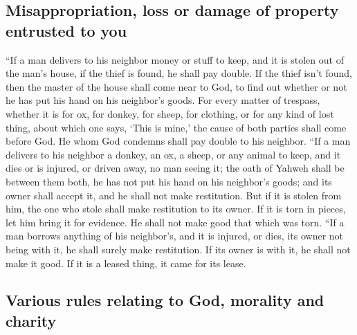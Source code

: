 \hypertarget{misappropriation-loss-or-damage-of-property-entrusted-to-you}{%
\subsection{Misappropriation, loss or damage of property entrusted to
you}\label{misappropriation-loss-or-damage-of-property-entrusted-to-you}}

 ``If a man delivers to his neighbor money or stuff to
keep, and it is stolen out of the man's house, if the thief is found, he
shall pay double.  If the thief isn't found, then the
master of the house shall come near to God, to find out whether or not
he has put his hand on his neighbor's goods.  For every
matter of trespass, whether it is for ox, for donkey, for sheep, for
clothing, or for any kind of lost thing, about which one says, `This is
mine,' the cause of both parties shall come before God. He whom God
condemns shall pay double to his neighbor.  ``If a man
delivers to his neighbor a donkey, an ox, a sheep, or any animal to
keep, and it dies or is injured, or driven away, no man seeing it;
 the oath of Yahweh shall be between them both, he has
not put his hand on his neighbor's goods; and its owner shall accept it,
and he shall not make restitution.  But if it is stolen
from him, the one who stole shall make restitution to its owner.
 If it is torn in pieces, let him bring it for evidence.
He shall not make good that which was torn.  ``If a man
borrows anything of his neighbor's, and it is injured, or dies, its
owner not being with it, he shall surely make restitution.
 If its owner is with it, he shall not make it good. If
it is a leased thing, it came for its lease.

\hypertarget{various-rules-relating-to-god-morality-and-charity}{%
\subsection{Various rules relating to God, morality and
charity}\label{various-rules-relating-to-god-morality-and-charity}}

